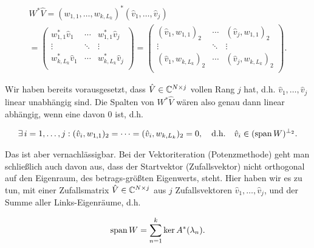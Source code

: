 \begin{enumerate}[label = \arabic*.]
    \begin{multline*}
        W^\ast \hat V
        =
        (w_{1, 1}, \dots, w_{k, L_k})^\ast (\hat v_1, \dots, \hat v_j) \\
        =
        \begin{pmatrix}
            w_{1, 1}^\ast   \hat v_1 & \cdots & w_{1, 1}^\ast   \hat v_j \\
            \vdots                   & \ddots & \vdots                   \\
            w_{k, L_k}^\ast \hat v_1 & \cdots & w_{k, L_k}^\ast \hat v_j \\
        \end{pmatrix}
        =
        \begin{pmatrix}
            (\hat v_1, w_{1, 1})_2   & \cdots & (\hat v_j, w_{1, 1})_2   \\
            \vdots                   & \ddots & \vdots                   \\
            (\hat v_1, w_{k, L_k})_2 & \cdots & (\hat v_j, w_{k, L_k})_2 \\
        \end{pmatrix}.
    \end{multline*}

    Wir haben bereits vorausgesetzt, dass $\hat V \in \mathbb{C}^{N \times j}$ vollen Rang $j$ hat, d.h. $\hat v_1, \dots, \hat v_j$ linear unabhängig sind.
    Die Spalten von $W^\ast \hat V$ wären also genau dann linear abhängig, wenn eine davon $0$ ist, d.h.

    \begin{align*}
        \exists \, i = 1, \dots, j:
            (\hat v_i, w_{1, 1})_2 = \cdots = (\hat v_i, w_{k, L_k})_2 = 0,
            \quad
            \text{d.h.}
            \quad
            \hat v_i \in (\operatorname{span} W)^{\bot_2}.
    \end{align*}

    Das ist aber vernachlässigbar.
    Bei der Vektoriteration (Potenzmethode) geht man schließlich auch davon aus, dass der Startvektor (Zufallsvektor) nicht orthogonal auf den Eigenraum, des betrags-größten Eigenwerts, steht.
    Hier haben wir es zu tun, mit einer Zufallsmatrix $\hat V \in \mathbb{C}^{N \times j}$ aus $j$ Zufallsvektoren $\hat v_1, \dots, \hat v_j$, und der Summe aller Links-Eigenräume, d.h.

    \begin{align*}
        \operatorname{span} W
        =
        \sum_{n=1}^k
            \ker A^\ast(\lambda_n).
    \end{align*}


\end{enumerate}
